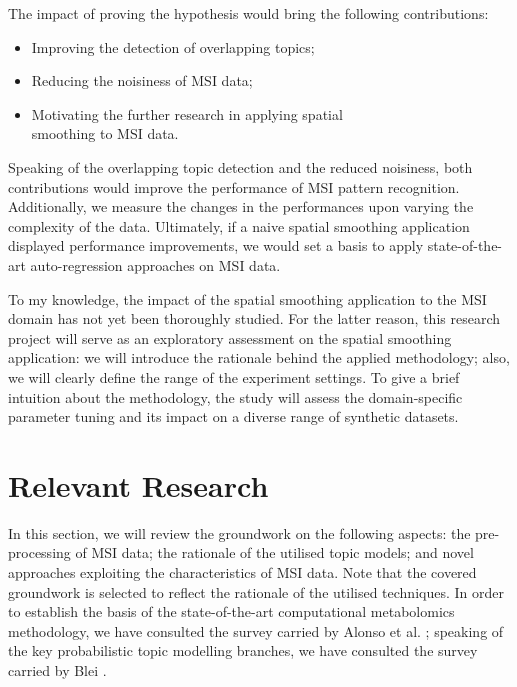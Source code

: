 \documentclass{mpaper}
\begin{document}
\par The impact of proving the hypothesis would bring the following contributions:
\begin{itemize}
	\item Improving the detection of overlapping topics;
	\item Reducing the noisiness of MSI data;
	\item Motivating the further research in applying spatial \\smoothing to MSI data.
\end{itemize} 
Speaking of the overlapping topic detection and the reduced noisiness, both contributions would improve the performance of MSI pattern recognition. Additionally, we measure the changes in the performances upon varying the complexity of the data. Ultimately, if a naive spatial smoothing application displayed performance improvements, we would set a basis to apply state-of-the-art auto-regression approaches on MSI data.

\par To my knowledge, the impact of the spatial smoothing application to the MSI domain has not yet been thoroughly studied. For the latter reason, this research project will serve as an exploratory assessment on the spatial smoothing application: we will introduce the rationale behind the applied methodology; also, we will clearly define the range of the experiment settings. To give a brief intuition about the methodology, the study will assess the domain-specific parameter tuning and its impact on a diverse range of synthetic datasets.

\section{Relevant Research}

\par In this section, we will review the groundwork on the following aspects: the pre-processing of MSI data; the rationale of the utilised topic models; and novel approaches exploiting the characteristics of MSI data. Note that the covered groundwork is selected to reflect the rationale of the utilised techniques. In order to establish the basis of the state-of-the-art computational metabolomics methodology, we have consulted the survey carried by Alonso et al. \cite{alonso2015analytical}; speaking of the key probabilistic topic modelling branches, we have consulted the survey carried by Blei \cite{blei2012probabilistic}. 
\end{document}
